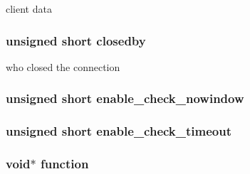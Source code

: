 client data 

\hypertarget{struct__tcp__stream___a6007459c2b9e0960b841fe8fd596b001}{
\subsubsection[{closedby}]{\setlength{\rightskip}{0pt plus 5cm}unsigned short closedby}}\label{struct__tcp__stream___a6007459c2b9e0960b841fe8fd596b001}


who closed the connection 

\hypertarget{struct__tcp__stream___a5a1f60051aef79a9ac2d6d89ac996da1}{
\subsubsection[{enable\-\_\-check\-\_\-nowindow}]{\setlength{\rightskip}{0pt plus 5cm}unsigned short enable\-\_\-check\-\_\-nowindow}}\label{struct__tcp__stream___a5a1f60051aef79a9ac2d6d89ac996da1}
\hypertarget{struct__tcp__stream___a23b5d0e5ed45fe6d2771469b246eaa42}{
\subsubsection[{enable\-\_\-check\-\_\-timeout}]{\setlength{\rightskip}{0pt plus 5cm}unsigned short enable\-\_\-check\-\_\-timeout}}\label{struct__tcp__stream___a23b5d0e5ed45fe6d2771469b246eaa42}
\hypertarget{struct__tcp__stream___aea3dcf0c8de30d192ee92494131c4996}{
\subsubsection[{function}]{\setlength{\rightskip}{0pt plus 5cm}void$\ast$ function}}\label{struct__tcp__stream___aea3dcf0c8de30d192ee92494131c4996}


